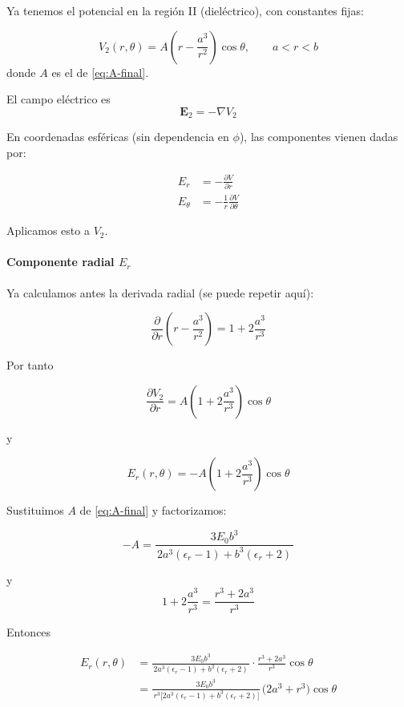 \documentclass{article}
\begin{document}
Ya tenemos el potencial en la región II (dieléctrico), con constantes fijas:

\begin{equation}
V_{2}(r,\theta)
= A\left(r - \frac{a^{3}}{r^{2}}\right)\cos\theta,
\qquad a<r<b
\label{eq:V2-final}
\end{equation}
donde $A$ es el de \eqref{eq:A-final}.

El campo eléctrico es
\[
\mathbf{E}_{2} = -\nabla V_{2}
\]

En coordenadas esféricas (sin dependencia en $\phi$), las componentes vienen dadas por:

\begin{align}
E_{r} &= -\frac{\partial V}{\partial r}
\label{eq:Er-def}\\[4pt]
E_{\theta} &= -\frac{1}{r}\frac{\partial V}{\partial\theta}
\label{eq:Eth-def}
\end{align}

Aplicamos esto a $V_{2}$.

\paragraph{Componente radial $E_{r}$}

Ya calculamos antes la derivada radial (se puede repetir aquí):

\[
\frac{\partial}{\partial r}\left(r - \frac{a^{3}}{r^{2}}\right)
= 1 + 2\frac{a^{3}}{r^{3}}
\]

Por tanto

\[
\frac{\partial V_{2}}{\partial r}
= A\left(1 + 2\frac{a^{3}}{r^{3}}\right)\cos\theta
\]

y

\begin{equation}
E_{r}(r,\theta)
= -A\left(1 + 2\frac{a^{3}}{r^{3}}\right)\cos\theta
\label{eq:Er-con-A}
\end{equation}

Sustituimos $A$ de \eqref{eq:A-final} y factorizamos:

\[
-A = \frac{3E_{0}b^{3}}
{\,2a^{3}(\epsilon_{r}-1) + b^{3}(\epsilon_{r}+2)\,}
\]

y
\[
1 + 2\frac{a^{3}}{r^{3}}
= \frac{r^{3} + 2a^{3}}{r^{3}}
\]

Entonces

\begin{align}
E_{r}(r,\theta)
&= \frac{3E_{0}b^{3}}{\,2a^{3}(\epsilon_{r}-1) + b^{3}(\epsilon_{r}+2)\,}
   \cdot \frac{r^{3} + 2a^{3}}{r^{3}} \cos\theta \\[4pt]
&= \frac{3E_{0} b^{3}}{\,r^{3}\bigl[2a^{3}(\epsilon_{r}-1) + b^{3}(\epsilon_{r}+2)\bigr]}\,
   \bigl(2a^{3} + r^{3}\bigr)\cos\theta
\end{align}
\end{document}
